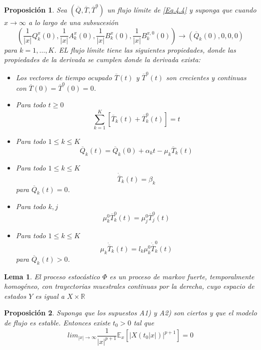 \documentclass{article}
\newtheorem{Prop}{Proposición}
\newtheorem{Lemma}{Lema}
\newcommand{\rea}{\mathbb{R}}
\newcommand{\esp}{\mathbb{E}}
\begin{document}
\begin{Prop}
 Sea $\left(\overline{Q},\overline{T},\overline{T}^{0}\right)$ un flujo l\'imite de \ref{Eq.4.4} y suponga que cuando $x\rightarrow\infty$ a lo largo de
una subsucesi\'on
\[\left(\frac{1}{|x|}Q_{k}^{x}\left(0\right),\frac{1}{|x|}A_{k}^{x}\left(0\right),\frac{1}{|x|}B_{k}^{x}\left(0\right),\frac{1}{|x|}B_{k}^{x,0}\left(0\right)\right)\rightarrow\left(\overline{Q}_{k}\left(0\right),0,0,0\right)\]
para $k=1,\ldots,K$. EL flujo l\'imite tiene las siguientes
propiedades, donde las propiedades de la derivada se cumplen donde
la derivada exista:
\begin{itemize}
 \item[i)] Los vectores de tiempo ocupado $\overline{T}\left(t\right)$ y $\overline{T}^{0}\left(t\right)$ son crecientes y continuas con
$\overline{T}\left(0\right)=\overline{T}^{0}\left(0\right)=0$.
\item[ii)] Para todo $t\geq0$
\[\sum_{k=1}^{K}\left[\overline{T}_{k}\left(t\right)+\overline{T}_{k}^{0}\left(t\right)\right]=t\]
\item[iii)] Para todo $1\leq k\leq K$
\[\overline{Q}_{k}\left(t\right)=\overline{Q}_{k}\left(0\right)+\alpha_{k}t-\mu_{k}\overline{T}_{k}\left(t\right)\]
\item[iv)]  Para todo $1\leq k\leq K$
\[\dot{{\overline{T}}}_{k}\left(t\right)=\beta_{k}\] para $\overline{Q}_{k}\left(t\right)=0$.
\item[v)] Para todo $k,j$
\[\mu_{k}^{0}\overline{T}_{k}^{0}\left(t\right)=\mu_{j}^{0}\overline{T}_{j}^{0}\left(t\right)\]
\item[vi)]  Para todo $1\leq k\leq K$
\[\mu_{k}\dot{{\overline{T}}}_{k}\left(t\right)=l_{k}\mu_{k}^{0}\dot{{\overline{T}}}_{k}^{0}\left(t\right)\] para $\overline{Q}_{k}\left(t\right)>0$.
\end{itemize}
\end{Prop}


\begin{Lemma}\label{Lema.34.MeynDown}
El proceso estoc\'astico $\Phi$ es un proceso de markov fuerte,
temporalmente homog\'eneo, con trayectorias muestrales continuas
por la derecha, cuyo espacio de estados $Y$ es igual a
$X\times\rea$
\end{Lemma}
\begin{Prop}
 Suponga que los supuestos A1) y A2) son ciertos y que el modelo de flujo es estable. Entonces existe $t_{0}>0$ tal que
\begin{equation}
 lim_{|x|\rightarrow\infty}\frac{1}{|x|^{p+1}}\esp_{x}\left[|X\left(t_{0}|x|\right)|^{p+1}\right]=0
\end{equation}
\end{Prop}
\end{document}
